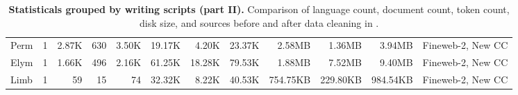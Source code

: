 \begin{table*}[!htp]
{\begin{tabular}{l|c|rrr|rrr|rrr|l}
Perm                    & 1                        & 2.87K    & 630      & 3.50K   & 19.17K  & 4.20K   & 23.37K  & 2.58MB   & 1.36MB   & 3.94MB   & Fineweb-2, New CC              \\
Elym                    & 1                        & 1.66K    & 496      & 2.16K   & 61.25K  & 18.28K  & 79.53K  & 1.88MB   & 7.52MB   & 9.40MB   & Fineweb-2, New CC              \\
Limb                    & 1                        & 59       & 15       & 74      & 32.32K  & 8.22K   & 40.53K  & 754.75KB & 229.80KB & 984.54KB & Fineweb-2, New CC             \\
\bottomrule
\end{tabular}
}
\caption{
\label{tab:app_script_2}
\textbf{Statisticals grouped by writing scripts (part II).}
Comparison of language count, document count, token count, disk size,  and sources before and after data cleaning in \dcad.
}
\end{table*}
